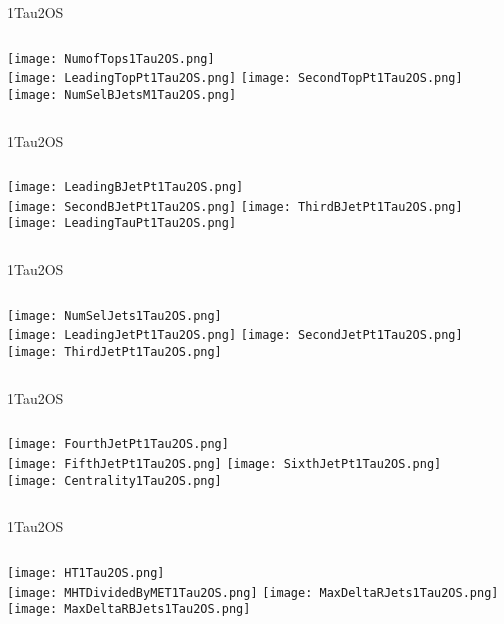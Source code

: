 \documentclass{beamer}
\begin{document}
\begin{frame}{1Tau2OS}
    \begin{columns}[t]
    \centering
    \texttt{[image: NumofTops1Tau2OS.png]}\\
    \texttt{[image: LeadingTopPt1Tau2OS.png]}
    \centering
    \texttt{[image: SecondTopPt1Tau2OS.png]}\\
    \texttt{[image: NumSelBJetsM1Tau2OS.png]}
    \end{columns}
\end{frame}
\begin{frame}{1Tau2OS}
    \begin{columns}[t]
    \centering
    \texttt{[image: LeadingBJetPt1Tau2OS.png]}\\
    \texttt{[image: SecondBJetPt1Tau2OS.png]}
    \centering
    \texttt{[image: ThirdBJetPt1Tau2OS.png]}\\
    \texttt{[image: LeadingTauPt1Tau2OS.png]}
    \end{columns}
\end{frame}
\begin{frame}{1Tau2OS}
    \begin{columns}[t]
    \centering
    \texttt{[image: NumSelJets1Tau2OS.png]}\\
    \texttt{[image: LeadingJetPt1Tau2OS.png]}
    \centering
    \texttt{[image: SecondJetPt1Tau2OS.png]}\\
    \texttt{[image: ThirdJetPt1Tau2OS.png]}
    \end{columns}
\end{frame}
\begin{frame}{1Tau2OS}
    \begin{columns}[t]
    \centering
    \texttt{[image: FourthJetPt1Tau2OS.png]}\\
    \texttt{[image: FifthJetPt1Tau2OS.png]}
    \centering
    \texttt{[image: SixthJetPt1Tau2OS.png]}\\
    \texttt{[image: Centrality1Tau2OS.png]}
    \end{columns}
\end{frame}
\begin{frame}{1Tau2OS}
    \begin{columns}[t]
    \centering
    \texttt{[image: HT1Tau2OS.png]}\\
    \texttt{[image: MHTDividedByMET1Tau2OS.png]}
    \centering
    \texttt{[image: MaxDeltaRJets1Tau2OS.png]}\\
    \texttt{[image: MaxDeltaRBJets1Tau2OS.png]}
    \end{columns}
\end{frame}
\end{document}
